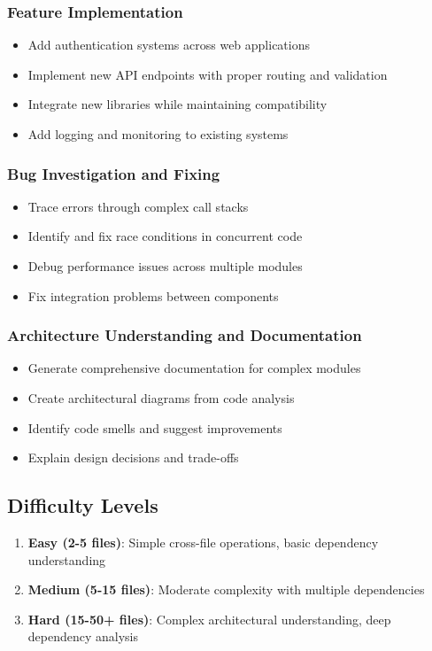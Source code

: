 \documentclass{article}
\begin{document}
\subsubsection{Feature Implementation}
\begin{itemize}
    \item Add authentication systems across web applications
    \item Implement new API endpoints with proper routing and validation
    \item Integrate new libraries while maintaining compatibility
    \item Add logging and monitoring to existing systems
\end{itemize}

\subsubsection{Bug Investigation and Fixing}
\begin{itemize}
    \item Trace errors through complex call stacks
    \item Identify and fix race conditions in concurrent code
    \item Debug performance issues across multiple modules
    \item Fix integration problems between components
\end{itemize}

\subsubsection{Architecture Understanding and Documentation}
\begin{itemize}
    \item Generate comprehensive documentation for complex modules
    \item Create architectural diagrams from code analysis
    \item Identify code smells and suggest improvements
    \item Explain design decisions and trade-offs
\end{itemize}

\subsection{Difficulty Levels}
\begin{enumerate}
    \item \textbf{Easy (2-5 files)}: Simple cross-file operations, basic dependency understanding
    \item \textbf{Medium (5-15 files)}: Moderate complexity with multiple dependencies
    \item \textbf{Hard (15-50+ files)}: Complex architectural understanding, deep dependency analysis
\end{enumerate}
\end{document}
